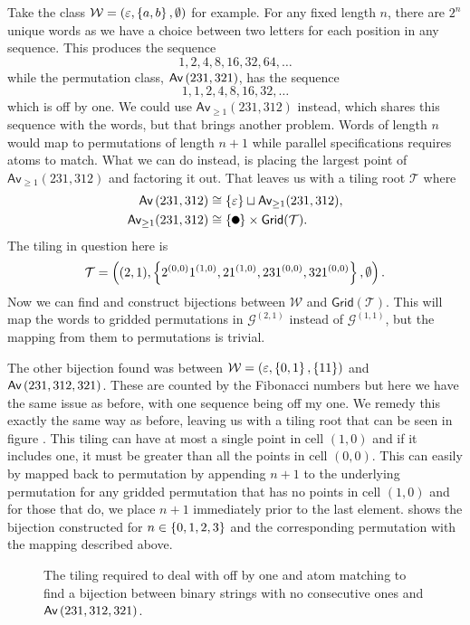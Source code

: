 Take the class $\mathcal{W} = (\varepsilon, \left\{a,b\right\}, \emptyset)$ for example. For any fixed length $n$, there are $2^n$ unique words as we have a choice between two letters for each position in any sequence. This produces the sequence 
\[
    1, 2, 4, 8, 16, 32, 64, \dotsc
\]
while the permutation class, $\textsf{Av}\left(231,321\right)$, has the sequence 
\[
    1, 1, 2, 4, 8, 16, 32, \dotsc
\]
which is off by one. We could use $\textsf{Av}_{\geq1}(231,312)$ instead, which shares this sequence with the words, but that brings another problem. Words of length $n$ would map to permutations of length $n+1$ while parallel specifications requires atoms to match. What we can do instead, is placing the largest point of $\textsf{Av}_{\geq1}(231,312)$ and factoring it out. That leaves us with a tiling root $\mathcal{T}$ where
\begin{align*}
    \Av{231,312} &\cong \set{\varepsilon} \sqcup \textsf{Av}_{\geq1}(231,312),\\
    \textsf{Av}_{\geq1}(231,312) &\cong \set{\point{0.1}}\times \textsf{Grid}(\mathcal{T}).
\end{align*}
The tiling in question here is
\[
    \mathcal{T} = \left((2,1), \left\{2^{(0,0)}1^{(1,0)}, 21^{(1,0)}, 231^{(0,0)}, 321^{(0,0)}\right\},\emptyset\right).
\]
Now we can find and construct bijections between $\mathcal{W}$ and $\textsf{Grid}(\mathcal{T})$. This will map the words to gridded permutations in $\mathcal{G}^{(2,1)}$ instead of $\mathcal{G}^{(1,1)}$, but the mapping from them to permutations is trivial.

The other bijection found was between $\mathcal{W} = (\varepsilon, \left\{0,1\right\}, \left\{11\right\})$ and $\textsf{Av}\left(231,312,321\right)$. These are counted by the Fibonacci numbers but here we have the same issue as before, with one sequence being off my one. We remedy this exactly the same way as before, leaving us with a tiling root that can be seen in figure . This tiling can have at most a single point in cell $(1,0)$ and if it includes one, it must be greater than all the points in cell $(0,0)$. This can easily by mapped back to permutation by appending $n+1$ to the underlying permutation for any gridded permutation that has no points in cell $(1,0)$ and for those that do, we place $n+1$ immediately prior to the last element.  shows the bijection constructed for $n \in \left\{0,1,2,3\right\}$ and the corresponding permutation with the mapping described above. 

\begin{figure}[ht!]
    \centering
    
    \caption{The tiling required to deal with off by one and atom matching to find a bijection between binary strings with no consecutive ones and $\textsf{Av}\left(231,312,321\right)$.}
    \label{fig:fibpermoffbyone}
\end{figure}

